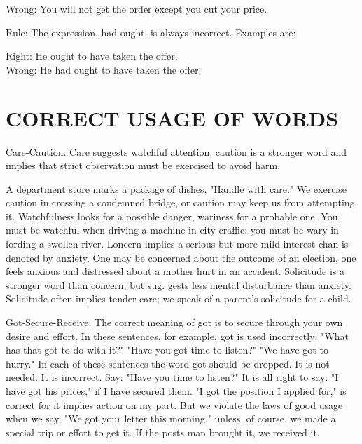 \documentclass[10pt]{article}
\begin{document}
Wrong: You will not get the order except you cut your price.

Rule: The expression, had ought, is always incorrect. Examples are:

Right: He ought to have taken the offer.\\
Wrong: He had ought to have taken the offer.

\section*{CORRECT USAGE OF WORDS}
Care-Caution. Care suggests watchful attention; caution is a stronger word and implies that strict observation must be exercised to avoid harm.

A department store marks a package of dishes, "Handle with care." We exercise caution in crossing a condemned bridge, or caution may keep us from attempting it. Watchfulness looks for a possible danger, wariness for a probable one. You must be watchful when driving a machine in city craffic; you must be wary in fording a swollen river. Loncern implies a serious but more mild interest chan is denoted by anxiety. One may be concerned about the outcome of an election, one feels anxious and distressed about a mother hurt in an accident. Solicitude is a stronger word than concern; but sug. gests less mental disturbance than anxiety. Solicitude often implies tender care; we speak of a parent's solicitude for a child.

Got-Secure-Receive. The correct meaning of got is to secure through your own desire and effort. In these sentences, for example, got is used incorrectly: "What has that got to do with it?" "Have you got time to listen?" "We have got to hurry." In each of these sentences the word got should be dropped. It is not needed. It is incorrect. Say: "Have you time to listen?" It is all right to say: "I have got his prices," if I have secured them. "I got the position I applied for," is correct for it implies action on my part. But we violate the laws of good usage when we say, "We got your letter this morning," unless, of course, we made a special trip or effort to get it. If the posts man brought it, we received it.
\end{document}

